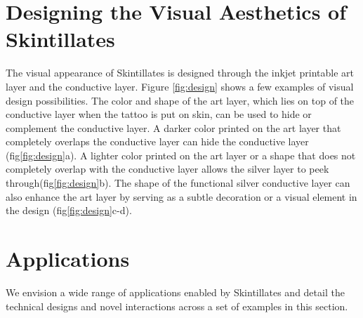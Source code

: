 \documentclass{sigchi}
\begin{document}
\section{Designing the Visual Aesthetics of Skintillates}
The visual appearance of Skintillates is designed through the inkjet printable art layer and the conductive layer. Figure \ref{fig:design} shows a few examples of visual design possibilities. The color and shape of the art layer, which lies on top of the conductive layer when the tattoo is put on skin, can be used to hide or complement the conductive layer. A darker color printed on the art layer that completely overlaps the conductive layer can hide the conductive layer (fig\ref{fig:design}a). A lighter color printed on the art layer or a shape that does not completely overlap with the conductive layer allows the silver layer to peek through(fig\ref{fig:design}b). The shape of the functional silver conductive layer can also enhance the art layer by serving as a subtle decoration or a visual element in the design (fig\ref{fig:design}c-d). 



\section{Applications}
We envision a wide range of applications enabled by Skintillates and detail the technical designs and novel interactions across a set of examples in this section.
\end{document}
